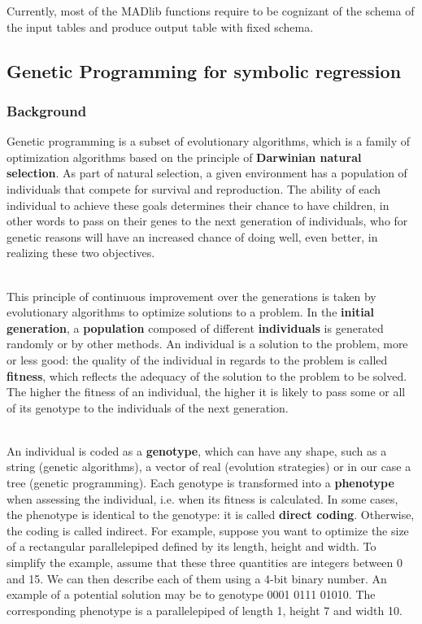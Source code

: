 Currently, most of the MADlib functions require to be cognizant of the schema of the input tables and produce output table with fixed schema. 

\subsection{Genetic Programming for symbolic regression}
\subsubsection{Background}

Genetic programming is a subset of evolutionary algorithms, which is a family of optimization algorithms based on the principle of \textbf{Darwinian natural selection}. As part of natural selection, a given environment has a population of individuals that compete for survival and reproduction. The ability of each individual to achieve these goals determines their chance to have children, in other words to pass on their genes to the next generation of individuals, who for genetic reasons will have an increased chance of doing well, even better, in realizing these two objectives.

~~\\
This principle of continuous improvement over the generations is taken by evolutionary algorithms to optimize solutions to a problem. In the \textbf {initial generation}, a \textbf{population} composed of different \textbf {individuals} is generated randomly or by other methods. An individual is a solution to the problem, more or less good: the quality of the individual in regards to the problem is called \textbf{fitness}, which reflects the adequacy of the solution to the problem to be solved. The higher the fitness of an individual, the higher it is likely to pass some or all of its genotype to the individuals of the next generation.

~~\\
An individual is coded as a \textbf{genotype}, which can have any shape, such as a string (genetic algorithms), a vector of real (evolution strategies) or in our case a tree (genetic programming). Each genotype is transformed into a \textbf{phenotype} when assessing the individual, i.e. when its fitness is calculated. In some cases, the phenotype is identical to the genotype: it is called \textbf{direct coding}. Otherwise, the coding is called indirect. For example, suppose you want to optimize the size of a rectangular parallelepiped defined by its length, height and width. To simplify the example, assume that these three quantities are integers between 0 and 15. We can then describe each of them using a 4-bit binary number. An example of a potential solution may be to genotype 0001 0111 01010. The corresponding phenotype is a parallelepiped of length 1, height 7 and width 10.

